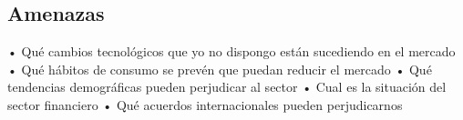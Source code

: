 \subsection{Amenazas}
• Qué cambios tecnológicos que yo no dispongo están sucediendo en el mercado 
• Qué hábitos de consumo se prevén que puedan reducir el mercado 
• Qué tendencias demográficas pueden perjudicar al sector 
• Cual es la situación del sector financiero 
• Qué acuerdos internacionales pueden perjudicarnos 

\begin{itemize}
\end{itemize}